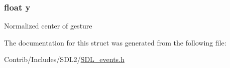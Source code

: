 \subsubsection[{\texorpdfstring{y}{y}}]{\setlength{\rightskip}{0pt plus 5cm}float y}\hypertarget{struct_s_d_l___dollar_gesture_event_aa4f0d3eebc3c443f9be81bf48561a217}{}\label{struct_s_d_l___dollar_gesture_event_aa4f0d3eebc3c443f9be81bf48561a217}
Normalized center of gesture 

The documentation for this struct was generated from the following file\+:\begin{DoxyCompactItemize}
\item 
Contrib/\+Includes/\+S\+D\+L2/\hyperlink{_s_d_l__events_8h}{S\+D\+L\+\_\+events.\+h}\end{DoxyCompactItemize}
